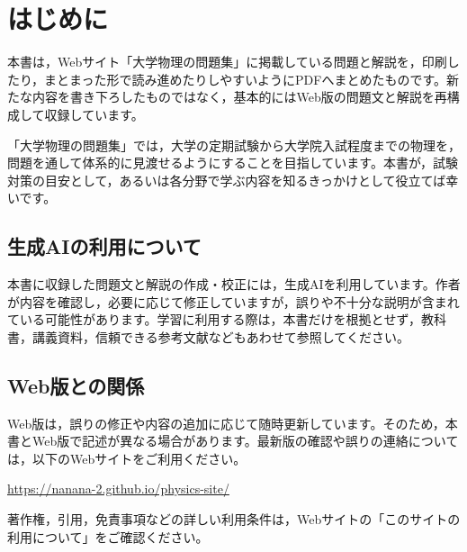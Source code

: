 \chapter*{はじめに}

本書は，Webサイト「大学物理の問題集」に掲載している問題と解説を，印刷したり，まとまった形で読み進めたりしやすいようにPDFへまとめたものです。新たな内容を書き下ろしたものではなく，基本的にはWeb版の問題文と解説を再構成して収録しています。

「大学物理の問題集」では，大学の定期試験から大学院入試程度までの物理を，問題を通して体系的に見渡せるようにすることを目指しています。本書が，試験対策の目安として，あるいは各分野で学ぶ内容を知るきっかけとして役立てば幸いです。

\section*{生成AIの利用について}

本書に収録した問題文と解説の作成・校正には，生成AIを利用しています。作者が内容を確認し，必要に応じて修正していますが，誤りや不十分な説明が含まれている可能性があります。学習に利用する際は，本書だけを根拠とせず，教科書，講義資料，信頼できる参考文献などもあわせて参照してください。

\section*{Web版との関係}

Web版は，誤りの修正や内容の追加に応じて随時更新しています。そのため，本書とWeb版で記述が異なる場合があります。最新版の確認や誤りの連絡については，以下のWebサイトをご利用ください。

\begin{center}
  \url{https://nanana-2.github.io/physics-site/}
\end{center}

著作権，引用，免責事項などの詳しい利用条件は，Webサイトの「このサイトの利用について」をご確認ください。
